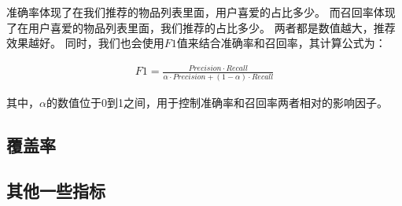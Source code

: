 准确率体现了在我们推荐的物品列表里面，用户喜爱的占比多少。
而召回率体现了在用户喜爱的物品列表里面，我们推荐的占比多少。
两者都是数值越大，推荐效果越好。
同时，我们也会使用$F1$值来结合准确率和召回率，其计算公式为：

\begin{equation}
\begin{split}
F1 = \frac{Precision \cdot Recall}{ \alpha \cdot Precision + (1 - \alpha) \cdot Recall }
\end{split}
\end{equation}

其中，$\alpha$的数值位于0到1之间，用于控制准确率和召回率两者相对的影响因子。

\subsection{覆盖率}


\subsection{其他一些指标}







